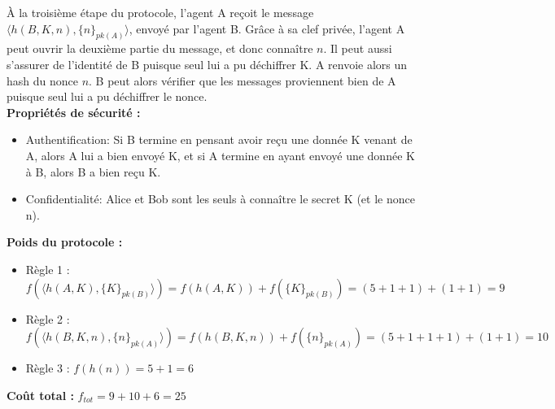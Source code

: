 \documentclass[10pt,a4paper]{article}
\begin{document}
À la troisième étape du protocole, l'agent A reçoit le message $\langle h(B, K, n), \{n\}_{pk(A)} \rangle $, envoyé par l'agent B.
Grâce à sa clef privée, l'agent A peut ouvrir la deuxième partie du message, et donc connaître $n$.
Il peut aussi s'assurer de l'identité de B puisque seul lui a pu déchiffrer K.
A renvoie alors un hash du nonce $n$. B peut alors vérifier que les messages proviennent bien de A puisque seul lui a pu déchiffrer le nonce.\\


\textbf{Propriétés de sécurité :}
\begin{itemize}
 \item Authentification: Si B termine en pensant avoir reçu une donnée K venant de A, alors A lui a bien envoyé K, et si A termine en ayant envoyé une donnée K à B, alors B a bien reçu K.
 \item Confidentialité: Alice et Bob sont les seuls à connaître le secret K (et le nonce n).
\end{itemize}


\textbf{Poids du protocole :}
\begin{itemize}
\item Règle 1 : $f( \langle h(A, K), \{K\}_{pk(B)} \rangle ) = f ( h(A, K) ) + f ( \{K\}_{pk(B)} ) = (5 + 1 + 1) + (1 + 1) = 9 $
\item Règle 2 : $f(\langle h(B, K, n), \{n\}_{pk(A)} \rangle) = f(h(B, K, n)) + f(\{n\}_{pk(A)}) = (5 + 1 + 1 + 1) + (1 + 1) = 10 $
\item Règle 3 : $f(h(n)) = 5 + 1 = 6$
\end{itemize}

\textbf{Coût total :} $f_{tot} = 9 + 10 + 6 = 25$


\newpage
\end{document}
